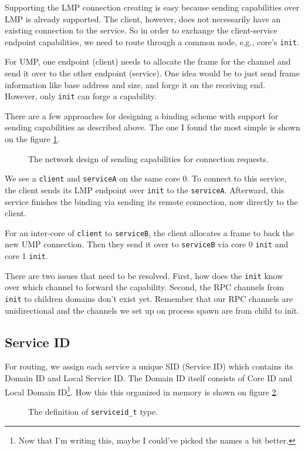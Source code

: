 Supporting the LMP connection creating is easy because sending capabilities over LMP is already supported. The client, however, does not necessarily have an existing connection to the service. So in order to exchange the client-service endpoint capabilities, we need to route through a common node, e.g., core's \texttt{init}.

For UMP, one endpoint (client) needs to allocate the frame for the channel and send it over to the other endpoint (service). One idea would be to just send frame information like base address and size, and forge it on the receiving end. However, only \texttt{init} can forge a capability.

There are a few approaches for designing a binding scheme with support for sending capabilities as described above. The one I found the most simple is shown on the figure \ref{fig:ns_network}.  

\begin{figure}[ht]
    \centering
        \scalebox{0.6}{}
    \caption{The network design of sending capabilities for connection requests.}
    \label{fig:ns_network}
\end{figure}


We see a \texttt{client} and \texttt{serviceA} on the same core 0. To connect to this service, the client sends its LMP endpoint over \texttt{init} to the \texttt{serviceA}. Afterward, this service finishes the binding via sending its remote connection, now directly to the client.

For an inter-core of \texttt{client} to \texttt{serviceB}, the client allocates a frame to back the new UMP connection. Then they send it over to \texttt{serviceB} via core 0 \texttt{init} and core 1 \texttt{init}.

There are two issues that need to be resolved. First, how does the \texttt{init} know over which channel to forward the capability. Second, the RPC channels from \texttt{init} to children domains don't exist yet. Remember that our RPC channels are unidirectional and the channels we set up on process spawn are from child to init.

\subsection{Service ID}
\label{sec:serviceid}
For routing, we assign each service a unique SID (Service ID) which contains its Domain ID and Local Service ID. The Domain ID itself consists of Core ID and Local Domain ID\footnote{Now that I'm writing this, maybe I could've picked the names a bit better.}. How this this organized in memory is shown on figure \ref{fig:ns_serviceid}.
\begin{figure}[ht]
    \centering
        \scalebox{0.6}{}
    \caption{The definition of \texttt{serviceid_t} type.}
    \label{fig:ns_serviceid}
\end{figure}

